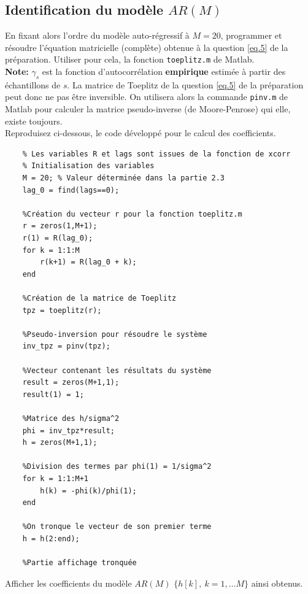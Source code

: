 \documentclass{article}
\begin{document}
\newpage
\subsection{Identification du modèle $AR(M)$}

En fixant alors l'ordre du modèle auto-régressif à $M=20$, programmer et résoudre l'équation matricielle (complète) obtenue à la question  \ref{eq.5} de la préparation. Utiliser pour cela, la fonction {\tt toeplitz.m} de Matlab. \\[1mm]
\textbf{Note:} $\gamma_s$ est la fonction d'autocorrélation  \textbf{empirique} estimée à partir des échantillons de $s$. La matrice de Toeplitz de la question \ref{eq.5} de la préparation peut donc ne pas être inversible. On utilisera alors la commande {\tt pinv.m} de Matlab pour calculer la matrice pseudo-inverse (de Moore-Penrose) qui elle, existe toujours.\\[1mm]
Reproduisez ci-dessous, le code développé pour le calcul des coefficients.
 
\begin{verbatim}
    % Les variables R et lags sont issues de la fonction de xcorr
    % Initialisation des variables
    M = 20; % Valeur déterminée dans la partie 2.3
    lag_0 = find(lags==0);
    
    %Création du vecteur r pour la fonction toeplitz.m
    r = zeros(1,M+1);
    r(1) = R(lag_0);
    for k = 1:1:M
        r(k+1) = R(lag_0 + k);
    end
    
    %Création de la matrice de Toeplitz
    tpz = toeplitz(r);
    
    %Pseudo-inversion pour résoudre le système 
    inv_tpz = pinv(tpz);
    
    %Vecteur contenant les résultats du système
    result = zeros(M+1,1);
    result(1) = 1;
    
    %Matrice des h/sigma^2
    phi = inv_tpz*result;
    h = zeros(M+1,1);
    
    %Division des termes par phi(1) = 1/sigma^2
    for k = 1:1:M+1
        h(k) = -phi(k)/phi(1);
    end
    
    %On tronque le vecteur de son premier terme
    h = h(2:end);    
    
    %Partie affichage tronquée
\end{verbatim}

\clearpage
Afficher les coefficients  du modèle $AR(M)$ $\{h[k],~k=1,\ldots M\}$ ainsi obtenus.
\end{document}
